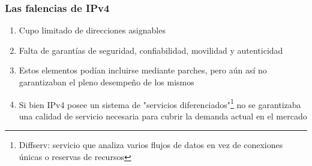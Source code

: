 \documentclass{beamer}
\begin{document}
%


\begin{frame}
\frametitle{Las falencias de IPv4}

\begin{enumerate}[$*$]

	\item Cupo limitado de direcciones asignables
	\item Falta de garant\'ias de seguridad, confiabilidad, movilidad y autenticidad
	\item Estos elementos podían incluirse mediante parches, pero a\'un as\'i no garantizaban el pleno desempeño de los mismos
	\item Si bien IPv4 posee un sistema de "servicios diferenciados"\footnote[1]{Diffserv: servicio que analiza varios flujos de datos en vez de conexiones únicas o reservas de recursos } no se garantizaba una calidad de servicio necesaria para cubrir la demanda actual en el mercado
\end{enumerate}



\end{frame}
\end{document}

